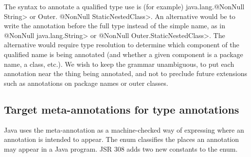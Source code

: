 \documentclass[10pt]{article}
\begin{document}
The syntax to annotate a qualified type use is (for example) 
\<java.lang.@NonNull String> or \<Outer. @NonNull StaticNestedClass>.
An alternative would be to write the annotation before the full type
instead of the simple name, as in \<@NonNull java.lang.String> or
\<@NonNull Outer.StaticNestedClass>.  The alternative would require type
resolution to determine which component of the qualified name is being
annotated (and whether a given component is a package name, a class, etc.).
We wish to keep the grammar unambiguous, to put each annotation near the
thing being annotated, and not to preclude future extensions such as
annotations on package names or outer classes.


\subsection{Target meta-annotations for type annotations\label{target-meta-annotation}}

Java uses the  meta-annotation as a machine-checked way of
expressing where an annotation is intended to appear.  The
 enum classifies the places an annotation may appear in a
Java program.  JSR 308 adds two new constants to the 
enum.
\end{document}
